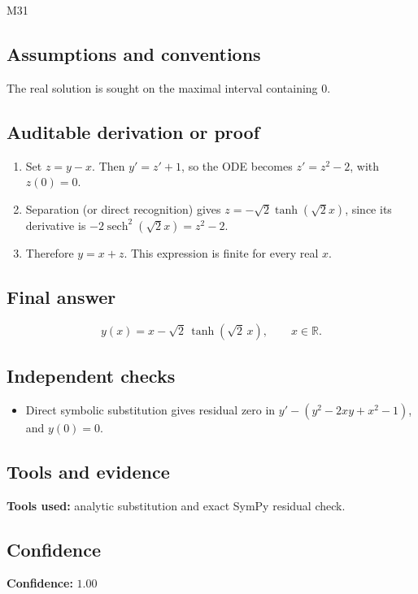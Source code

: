 \documentclass[11pt]{article}
\newcommand{\R}{\mathbb{R}}
\begin{document}
\begin{mprsolution}{M31}
\subsection*{Assumptions and conventions}
The real solution is sought on the maximal interval containing \(0\).
\subsection*{Auditable derivation or proof}
\begin{enumerate}[label=\textbf{Step \arabic*:},leftmargin=*]
\item Set \(z=y-x\).  Then \(y'=z'+1\), so the ODE becomes
\(z'=z^2-2\), with \(z(0)=0\).
\item Separation (or direct recognition) gives
\(z=-\sqrt2\tanh(\sqrt2x)\), since its derivative is
\(-2\operatorname{sech}^2(\sqrt2x)=z^2-2\).
\item Therefore \(y=x+z\).  This expression is finite for every real \(x\).
\end{enumerate}
\subsection*{Final answer}
\[
\boxed{\displaystyle y(x)=x-\sqrt2\,\tanh(\sqrt2\,x),\qquad x\in\R.}
\]
\subsection*{Independent checks}
\begin{itemize}[leftmargin=*]
\item Direct symbolic substitution gives residual zero in
\(y'-(y^2-2xy+x^2-1)\), and \(y(0)=0\).
\end{itemize}
\subsection*{Tools and evidence}
\textbf{Tools used:} analytic substitution and exact SymPy residual check.
\subsection*{Confidence}
\textbf{Confidence:} \(1.00\)
\end{mprsolution}
\end{document}
